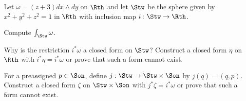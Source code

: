 Let $\omega=(z+3)dx\wedge dy$ on $\Rth$ and let $\Stw$ be the sphere
given by $x^2+y^2+z^2=1$ in $\Rth$ with inclusion map
$i:\Stw\rightarrow \Rth$.
\begin{alist}
\item Compute $\int_{\Stw}\omega$.
\item Why is the restriction $i^*\omega$ a closed form on $\Stw$?
Construct a closed form $\eta$ on $\Rth$ with $i^*\eta=i^*\omega$ or
prove that such a form cannot exist.
\item For a preassigned $p\in \Son$, define $j:\Stw\rightarrow
\Stw\times \Son$ by $j(q)=(q,p)$. Construct a closed form $\zeta$ on
$\Stw\times \Son$ with $j^*\zeta=i^*\omega$ or prove that such a form
cannot exist.
\end{alist}
